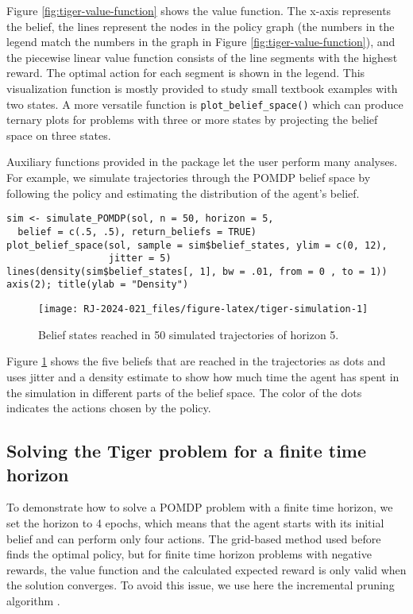 Figure \ref{fig:tiger-value-function} shows the value function.
The x-axis represents the belief, the lines represent the nodes in the policy graph (the numbers in the legend match the numbers in the graph in Figure \ref{fig:tiger-value-function}),
and the piecewise linear value function consists of the line segments with the highest reward.
The optimal action for each segment is shown in the legend.
This visualization function is mostly provided to study small textbook examples
with two states. A more versatile function is \texttt{plot\_belief\_space()} which can produce
ternary plots for problems with three or more states by projecting the belief
space on three states.

Auxiliary functions provided in the package let the user perform many analyses. For example, we simulate
trajectories through the POMDP belief space by following the policy and estimating the distribution of the
agent's belief.

\begin{verbatim}
sim <- simulate_POMDP(sol, n = 50, horizon = 5, 
  belief = c(.5, .5), return_beliefs = TRUE)
plot_belief_space(sol, sample = sim$belief_states, ylim = c(0, 12), 
                  jitter = 5)
lines(density(sim$belief_states[, 1], bw = .01, from = 0 , to = 1)) 
axis(2); title(ylab = "Density")
\end{verbatim}

\begin{figure}
\texttt{[image: RJ-2024-021\_files/figure-latex/tiger-simulation-1]} \caption{Belief states reached in 50 simulated trajectories of horizon 5.}\label{fig:tiger-simulation}
\end{figure}

Figure \ref{fig:tiger-simulation} shows the five beliefs that are
reached in the trajectories as dots and uses jitter and a density estimate to show how
much time the agent has spent in the simulation in different parts of the belief space. The color of the dots indicates the actions chosen by the policy.

\subsection{Solving the Tiger problem for a finite time horizon}\label{solving-the-tiger-problem-for-a-finite-time-horizon}

To demonstrate how to solve a POMDP problem with a finite time horizon,
we set the horizon to 4 epochs, which means that the agent starts with its initial
belief and can perform only four actions.
The grid-based method used before
finds the optimal policy, but for finite time horizon problems with negative rewards, the
value function and the calculated expected reward is only valid when the solution converges.
To avoid this issue, we use here the incremental pruning
algorithm \citep{Zhang1996, Cassandra1997}.

